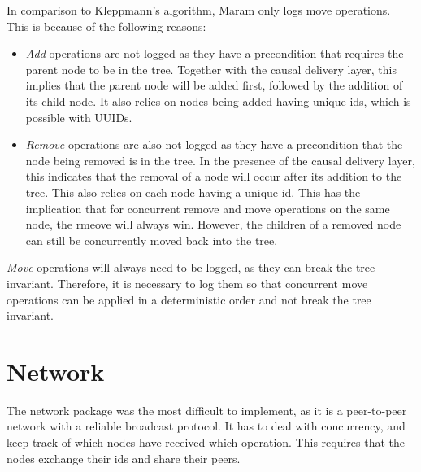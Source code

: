 \documentclass[12pt]{report}
\begin{document}
In comparison to Kleppmann's algorithm, Maram only logs move operations. This is because of the following reasons:
\begin{itemize}
    \item \textit{Add} operations are not logged as they have a precondition that requires the parent node to be in the tree. Together with the causal delivery layer, this implies that the parent node will be added first, followed by the addition of its child node. It also relies on nodes being added having unique ids, which is possible with UUIDs.
    \item \textit{Remove} operations are also not logged as they have a precondition that the node being removed is in the tree. In the presence of the causal delivery layer, this indicates that the removal of a node will occur after its addition to the tree. This also relies on each node having a unique id. This has the implication that for concurrent remove and move operations on the same node, the rmeove will always win. However, the children of a removed node can still be concurrently moved back into the tree.
\end{itemize}
\textit{Move} operations will always need to be logged, as they can break the tree invariant. Therefore, it is necessary to log them so that concurrent move operations can be applied in a deterministic order and not break the tree invariant. \par

\section{Network}
The network package was the most difficult to implement, as it is a peer-to-peer network with a reliable broadcast protocol. It has to deal with concurrency, and keep track of which nodes have received which operation. This requires that the nodes exchange their ids and share their peers. \par
\end{document}
